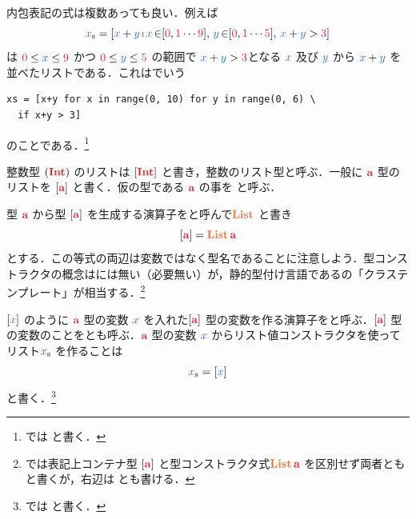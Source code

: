 \documentclass[a5paper,twoside,fleqn,draft]{jsbook}
\begin{document}
内包表記の式は複数あっても良い．例えば
\begin{equation}
  \hListVar{x}
  =[\hVar{x}+\hVar{y}\mListComp\hVar{x}\mFrom[\hConstant{0},\hConstant{1}\dotsb\hConstant{9}],\,\hVar{y}\mFrom[\hConstant{0},\hConstant{1}\dotsb\hConstant{5}],\,\hVar{x}+\hVar{y}>\hConstant{3}]
\end{equation}
は $\hConstant{0}\le\hVar{x}\le\hConstant{9}$ かつ $\hConstant{0}\le\hVar{y}\le\hConstant{5}$ の範囲で $\hVar{x}+\hVar{y}>\hConstant{3}$となる $\hVar{x}$ 及び $\hVar{y}$ から $\hVar{x}+\hVar{y}$ を並べたリストである．これは\python でいう
\begin{pythoncode}
\begin{verbatim}
xs = [x+y for x in range(0, 10) for y in range(0, 6) \
  if x+y > 3]
\end{verbatim}
\end{pythoncode}
のことである．\footnote{\haskell では  と書く．}


整数型 $(\hInt)$ のリストは $\hListConstruct{\hInt}$ と書き，整数のリスト型と呼ぶ．一般に $\hTypeName{a}$ 型のリストを $\hListConstruct{\hTypeName{a}}$ と書く．仮の型である $\hTypeName{a}$ の事を と呼ぶ．

型 $\hTypeName{a}$ から型 $\hListConstruct{\hTypeName{a}}$ を生成する演算子をと呼んで$\hList$ と書き
\begin{equation}
  \hListConstruct{\hTypeName{a}}
  =\hList\,\hTypeName{a}
\end{equation}
とする．この等式の両辺は変数ではなく型名であることに注意しよう．型コンストラクタの概念は\python には無い（必要無い）が，静的型付け言語である\cxx の「クラステンプレート」が相当する．\footnote{\haskell では表記上コンテナ型 $\hListConstruct{\hTypeName{a}}$ と型コンストラクタ式$\hList\,\hTypeName{a}$ を区別せず両者とも \code{[a]} と書くが，右辺は  とも書ける．}

$\hListWith{\hVar{x}}$ のように $\hTypeName{a}$ 型の変数 $\hVar{x}$ を入れた$\hListConstruct{\hTypeName{a}}$ 型の変数を作る演算子をと呼ぶ．$\hListConstruct{\hTypeName{a}}$ 型の変数のことをとも呼ぶ．$\hTypeName{a}$ 型の変数 $\hVar{x}$ からリスト値コンストラクタを使ってリスト$\hListVar{x}$ を作ることは
\begin{equation}
  \hListVar{x}
  =\hListWith{\hVar{x}}
\end{equation}
と書く．\footnote{\haskell では  と書く．}
\end{document}
